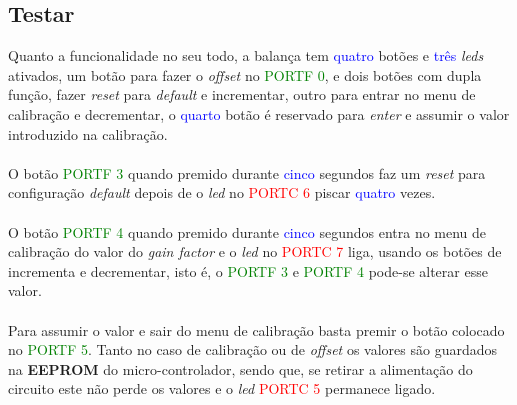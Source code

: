 \subsection{Testar}
Quanto a funcionalidade no seu todo, a balança tem \textcolor{blue}{quatro} botões e \textcolor{blue}{três} \textit{leds} ativados, um botão para fazer o \textit{offset} no \textcolor{green}{PORTF 0}, e dois botões com dupla função, fazer \textit{reset} para \textit{default} e incrementar, outro para entrar no menu de calibração e decrementar, o \textcolor{blue}{quarto} botão é reservado para \textit{enter} e assumir o valor introduzido na calibração.\\
\\
O botão \textcolor{green}{PORTF 3} quando premido durante \textcolor{blue}{cinco} segundos faz um \textit{reset} para configuração \textit{default} depois de o \textit{led} no \textcolor{red}{PORTC 6} piscar \textcolor{blue}{quatro} vezes.\\
\\
O botão \textcolor{green}{PORTF 4} quando premido durante \textcolor{blue}{cinco} segundos entra no menu de calibração do valor do \textit{gain factor} e o \textit{led} no \textcolor{red}{PORTC 7} liga, usando os botões de incrementa e decrementar, isto é, o
\textcolor{green}{PORTF 3} e \textcolor{green}{PORTF 4} pode-se alterar esse valor.\\
\\
Para assumir o valor e sair do menu de calibração basta premir o botão colocado no \textcolor{green}{PORTF 5}. Tanto no caso de calibração ou de \textit{offset} os valores são guardados na \textbf{EEPROM} do micro-controlador, sendo que, se retirar a alimentação do circuito este não perde os valores e o \textit{led} \textcolor{red}{PORTC 5} permanece ligado.
\\
\\

